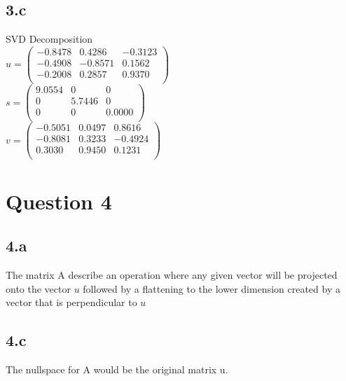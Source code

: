 \documentclass{article}
\begin{document}
\subsection*{3.c}
SVD Decomposition\\
$u =
\begin{pmatrix}
   -0.8478  &  0.4286  & -0.3123\\
   -0.4908  & -0.8571  &  0.1562\\
   -0.2008  &  0.2857  &  0.9370\\
\end{pmatrix}$\\

$s =
\begin{pmatrix}
    9.0554   &      0   &     0 \\
         0   & 5.7446   &      0\\
         0   &      0   & 0.0000\\
\end{pmatrix}$\\

$v =
\begin{pmatrix}
   -0.5051  &  0.0497  &  0.8616\\
   -0.8081  &  0.3233  & -0.4924\\
    0.3030  &  0.9450  &  0.1231\\
\end{pmatrix}$
\section{Question 4}
\subsection{4.a}
The matrix A describe an operation where any given vector will be projected onto the vector $u$ followed by a flattening to the lower dimension created by a vector that is perpendicular to $u$
\subsection{4.c}
The nullspace for A would be the original matrix u.
\end{document}
